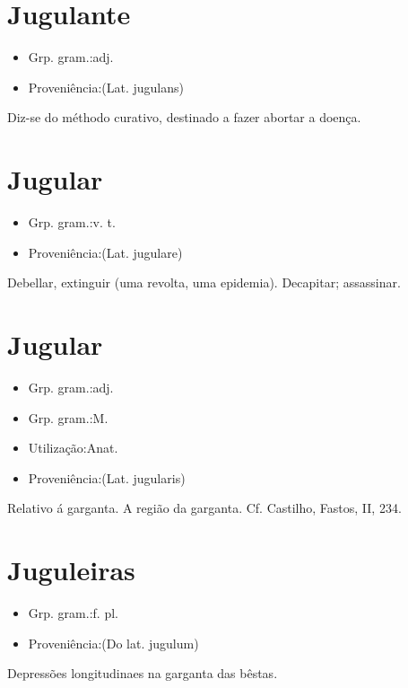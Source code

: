 \documentclass{article}
\begin{document}
\section{Jugulante}
\begin{itemize}
\item {Grp. gram.:adj.}
\end{itemize}
\begin{itemize}
\item {Proveniência:(Lat. \textunderscore jugulans\textunderscore )}
\end{itemize}
Diz-se do méthodo curativo, destinado a fazer abortar a doença.
\section{Jugular}
\begin{itemize}
\item {Grp. gram.:v. t.}
\end{itemize}
\begin{itemize}
\item {Proveniência:(Lat. \textunderscore jugulare\textunderscore )}
\end{itemize}
Debellar, extinguir (uma revolta, uma epidemia).
Decapitar; assassinar.
\section{Jugular}
\begin{itemize}
\item {Grp. gram.:adj.}
\end{itemize}
\begin{itemize}
\item {Grp. gram.:M.}
\end{itemize}
\begin{itemize}
\item {Utilização:Anat.}
\end{itemize}
\begin{itemize}
\item {Proveniência:(Lat. \textunderscore jugularis\textunderscore )}
\end{itemize}
Relativo á garganta.
A região da garganta. Cf. Castilho, \textunderscore Fastos\textunderscore , II, 234.
\section{Juguleiras}
\begin{itemize}
\item {Grp. gram.:f. pl.}
\end{itemize}
\begin{itemize}
\item {Proveniência:(Do lat. \textunderscore jugulum\textunderscore )}
\end{itemize}
Depressões longitudinaes na garganta das bêstas.
\end{document}
